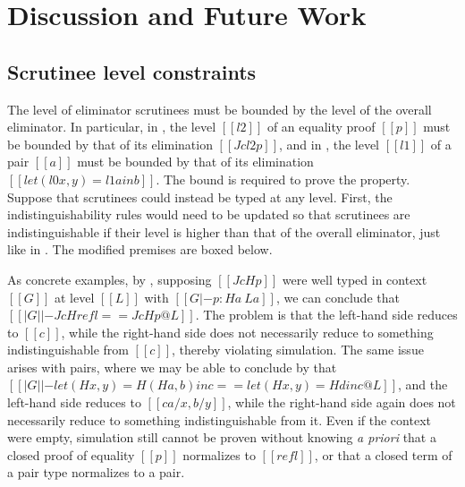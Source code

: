 \documentclass[acmsmall, screen=true, nonacm=true,
  review=\ifpublic false\else true\fi,
  anonymous=\ifanonymous true\else false\fi
]{acmart}
\makeatletter
\newcommand{\sw}[1]{}
\newcommand{\apriori}{\textit{a priori}\@\xspace}
\makeatother
\begin{document}
\section{Discussion and Future Work}

\subsection{Scrutinee level constraints} \label{sec:scrutinee-level}
\sw{I wish this section talked a little more about strictness. If we had a CBV application,
then I guess we would need to have a scrutinee constraint in application. OTOH, if we have
a lazy let term, we would not need this constraint.}

The level of eliminator scrutinees must be bounded by the level of the overall eliminator.
In particular, in , the level $[[l2]]$ of an equality proof $[[p]]$
must be bounded by that of its elimination $[[J c l2 p]]$,
and in , the level $[[l1]]$ of a pair $[[a]]$
must be bounded by that of its elimination $[[let (l0 x, y) = l1 a in b]]$.
The bound is required to prove the  property.
Suppose that scrutinees could instead be typed at any level.
First, the indistinguishability rules would need to be updated
so that scrutinees are indistinguishable if their level is higher
than that of the overall eliminator, just like in .
The modified premises are boxed below.
%

As concrete examples, by ,
supposing $[[J c H p]]$ were well typed in context $[[G]]$
at level $[[L]]$ with $[[G |- p : H a ~ L a]]$,
we can conclude that $[[| G | |- J c H refl == J c H p @ L]]$.
The problem is that the left-hand side reduces to $[[c]]$,
while the right-hand side does not necessarily reduce to something indistinguishable from $[[c]]$,
thereby violating simulation.
The same issue arises with pairs, where we may be able to conclude by  that
$[[| G | |- let (H x, y) = H (H a, b) in c == let (H x, y) = H d in c @ L]]$,
and the left-hand side reduces to $[[c {a / x, b / y}]]$,
while the right-hand side again does not necessarily reduce to something indistinguishable from it.
Even if the context were empty, simulation still cannot be proven
without knowing \apriori that a closed proof of equality $[[p]]$ normalizes to $[[refl]]$,
or that a closed term of a pair type normalizes to a pair.
\end{document}
